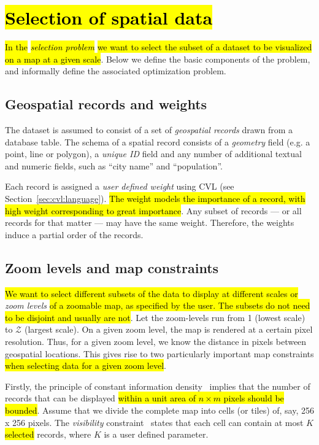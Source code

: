\section{\hl{Selection of spatial data}}
\label{sec:background}

\hl{In the }\emph{\hl{selection problem}}\hl{ we want to select the subset of a dataset to be visualized on a map at a given scale}. Below we define the basic components of the problem, and informally define the associated optimization problem.

\subsection{Geospatial records and weights}
\label{sec:records}

The dataset is assumed to consist of a set of \emph{geospatial records} drawn from a database table. The schema of a spatial record consists of a \emph{geometry} field (e.g. a point, line or polygon), a \emph{unique ID} field and any number of additional textual and numeric fields, such as ``city name'' and ``population''.

Each record is assigned a \emph{user defined weight} using CVL (see Section~\ref{sec:cvl:language}). \hl{The weight models the importance of a record, with high weight corresponding to great importance}. Any subset of records --- or all records for that matter --- may have the same weight. Therefore, the weights induce a partial order of the records.

\subsection{Zoom levels and map constraints}
\label{sec:constraints}
\hl{We want to select different subsets of the data to display at different scales or }\emph{zoom levels}\hl{ of a zoomable map, as specified by the user. The subsets do not need to be disjoint and usually are not}. Let the zoom-levels run from 1 (lowest scale) to $\mathcal{Z}$ (largest scale). On a given zoom level, the map is rendered at a certain pixel resolution. Thus, for a given zoom level, we know the distance in pixels between geospatial locations. This gives rise to two particularly important map constraints \hl{when selecting data for a given zoom level}.

Firstly, the principle of constant information density~\cite{topfer1966principles} implies that the number of records that can be displayed \hl{within a unit area of $n \times m$ pixels should be bounded}. Assume that we divide the complete map into cells (or tiles) of, say, 256 x 256 pixels. The \emph{visibility} constraint~\cite{sarma2012fusiontables} states that each cell can contain at most $K$ \hl{selected} records, where $K$ is a user defined parameter.

